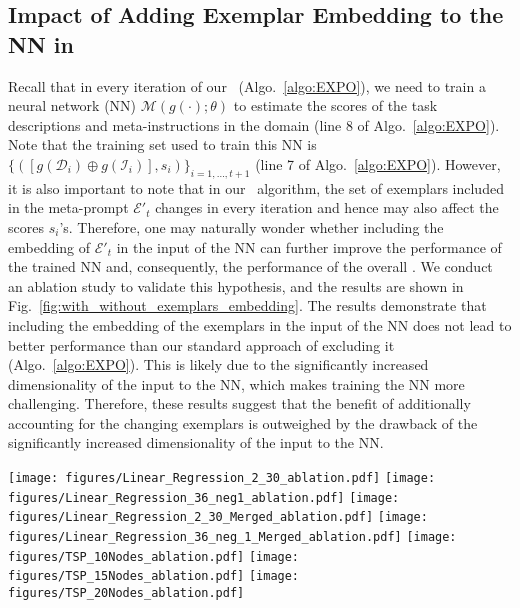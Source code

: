 \subsection{Impact of Adding Exemplar Embedding to the NN in \alg}
Recall that in every iteration of our \alg~(Algo.~\ref{algo:EXPO}), we need to train a neural network (NN) $\mathcal{M}(g(\cdot);\theta)$ to estimate the scores of the task descriptions and meta-instructions in the domain (line 8 of Algo.~\ref{algo:EXPO}).  
Note that the training set used to train this NN is $\{(\left[g(\mathcal{D}_i) \oplus g(\mathcal{I}_i)\right], s_i)\}_{i=1,\ldots,t+1}$ (line 7 of Algo.~\ref{algo:EXPO}).  
However, it is also important to note that in our \alg~algorithm, the set of exemplars included in the meta-prompt $\mathcal{E}'_{t}$ changes in every iteration and hence may also affect the scores $s_i$'s.  
Therefore, one may naturally wonder whether including the embedding of $\mathcal{E}'_{t}$ in the input of the NN can further improve the performance of the trained NN and, consequently, the performance of the overall \alg.  
We conduct an ablation study to validate this hypothesis, and the results are shown in Fig.~\ref{fig:with_without_exemplars_embedding}.  
The results demonstrate that including the embedding of the exemplars in the input of the NN does not lead to better performance than our standard approach of excluding it (Algo.~\ref{algo:EXPO}).  
This is likely due to the significantly increased dimensionality of the input to the NN, which makes training the NN more challenging.  
Therefore, these results suggest that the benefit of additionally accounting for the changing exemplars is outweighed by the drawback of the significantly increased dimensionality of the input to the NN.
\begin{figure*}[h]
    \centering
    \texttt{[image: figures/Linear\_Regression\_2\_30\_ablation.pdf]}
    \texttt{[image: figures/Linear\_Regression\_36\_neg1\_ablation.pdf]}
    \texttt{[image: figures/Linear\_Regression\_2\_30\_Merged\_ablation.pdf]}
    \texttt{[image: figures/Linear\_Regression\_36\_neg\_1\_Merged\_ablation.pdf]}
    \texttt{[image: figures/TSP\_10Nodes\_ablation.pdf]}
    \texttt{[image: figures/TSP\_15Nodes\_ablation.pdf]}
    \texttt{[image: figures/TSP\_20Nodes\_ablation.pdf]}
    \caption{Convergence curves of our \alg~with and without exemplars embedding across different tasks: Linear Regression (top row) and TSP with 10, 15, and 20 nodes (bottom row).}
    \label{fig:with_without_exemplars_embedding}
\end{figure*}



